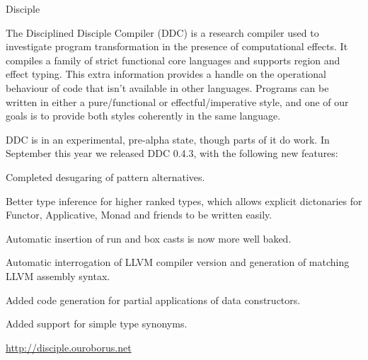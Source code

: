\begin{hcarentry}{Disciple}
\makeheader

The Disciplined Disciple Compiler (DDC) is a research compiler used to investigate program transformation in the presence of computational effects. It compiles a family of strict functional core languages and supports region and effect typing. This extra information provides a handle on the operational behaviour of code that isn't available in other languages. Programs can be written in either a pure/functional or effectful/imperative style, and one of our goals is to provide both styles coherently in the same language.

\WhatsNew

DDC is in an experimental, pre-alpha state, though parts of it do work. In September this year we released DDC 0.4.3, with the following new features:

\begin{compactitem}
\item Completed desugaring of pattern alternatives.
\item Better type inference for higher ranked types, which allows explicit dictonaries
      for Functor, Applicative, Monad and friends to be written easily.
\item Automatic insertion of run and box casts is now more well baked.
\item Automatic interrogation of LLVM compiler version and generation of matching LLVM assembly syntax.
\item Added code generation for partial applications of data constructors.
\item Added support for simple type synonyms.
\end{compactitem}

\FurtherReading
  \url{http://disciple.ouroborus.net}
\end{hcarentry}
